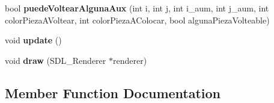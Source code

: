\begin{DoxyCompactItemize}
\item 
bool {\bfseries puede\+Voltear\+Alguna\+Aux} (int i, int j, int i\+\_\+aum, int j\+\_\+aum, int color\+Pieza\+A\+Voltear, int color\+Pieza\+A\+Colocar, bool alguna\+Pieza\+Volteable)\hypertarget{class_othello_juego_a8d7c4bb7e0bdace764dc2f9ce214861e}{}\label{class_othello_juego_a8d7c4bb7e0bdace764dc2f9ce214861e}

\item 
void {\bfseries update} ()\hypertarget{class_othello_juego_a6eacb8f0c59a7c08968927bc63e6374d}{}\label{class_othello_juego_a6eacb8f0c59a7c08968927bc63e6374d}

\item 
void {\bfseries draw} (S\+D\+L\+\_\+\+Renderer $\ast$renderer)\hypertarget{class_othello_juego_a575ed14d4b12111c33470e7988314c1d}{}\label{class_othello_juego_a575ed14d4b12111c33470e7988314c1d}

\end{DoxyCompactItemize}


\subsection{Member Function Documentation}
